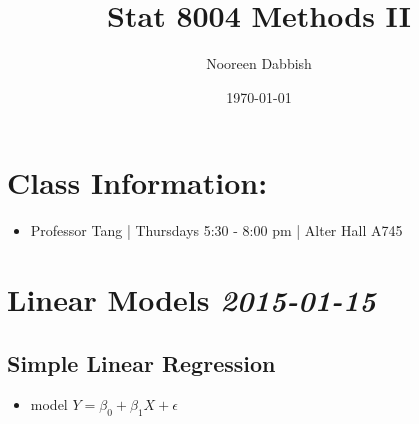 \documentclass[11pt]{article}
\title{Stat 8004 Methods II}
\author{Nooreen Dabbish}
\date{\today}
\begin{document}
\maketitle



 
\section*{Class Information:}
\label{sec-1}

\begin{itemize}
\item Professor Tang | Thursdays 5:30 - 8:00 pm | Alter Hall A745
\end{itemize}
\section*{Linear Models \textbf{\textit{2015-01-15}}}
\label{sec-2}
\subsection*{Simple Linear Regression}
\label{sec-2-1}

\begin{itemize}
\item model $Y =\beta_0 + \beta_1 X + \epsilon$
\end{itemize}
\end{document}
